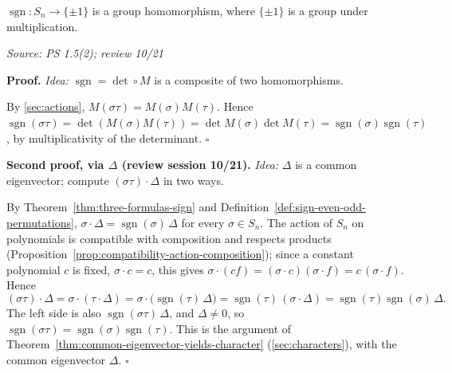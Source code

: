\documentclass[11pt]{report}
\newcommand{\sgn}{\operatorname{sgn}}
\renewenvironment{proof}[1][Proof]{\noindent\textbf{#1.} }{\hfill$\square$\par\vspace{5pt}}
\newcommand{\srcline}[1]{\par\hfill{\footnotesize\textit{Source: #1}}}
\begin{document}
\begin{thmbox}\label{thm:sign-homomorphism}
$\sgn: S_n \to \{\pm 1\}$ is a group homomorphism, where $\{\pm 1\}$ is a group under multiplication.
\srcline{PS 1.5(2); review 10/21}
\end{thmbox}

\begin{proof}
\textit{Idea:} $\sgn = \det \circ M$ is a composite of two homomorphisms.\par
By \ref{sec:actions}, $M(\sigma\tau) = M(\sigma)M(\tau)$. Hence $\sgn(\sigma\tau) = \det(M(\sigma)M(\tau)) = \det M(\sigma)\det M(\tau) = \sgn(\sigma)\sgn(\tau)$, by multiplicativity of the determinant.
\end{proof}

\begin{proof}[Second proof, via $\Delta$ (review session 10/21)]
\textit{Idea:} $\Delta$ is a common eigenvector; compute $(\sigma\tau) \cdot \Delta$ in two ways.\par
By Theorem~\ref{thm:three-formulas-sign} and Definition~\ref{def:sign-even-odd-permutations}, $\sigma \cdot \Delta = \sgn(\sigma)\,\Delta$ for every $\sigma \in S_n$. The action of $S_n$ on polynomials is compatible with composition and respects products (Proposition~\ref{prop:compatibility-action-composition}); since a constant polynomial $c$ is fixed, $\sigma \cdot c = c$, this gives $\sigma \cdot (c f) = (\sigma \cdot c)(\sigma \cdot f) = c\,(\sigma \cdot f)$. Hence
\[ (\sigma\tau) \cdot \Delta = \sigma \cdot (\tau \cdot \Delta) = \sigma \cdot \big(\sgn(\tau)\,\Delta\big) = \sgn(\tau)\,(\sigma \cdot \Delta) = \sgn(\tau)\sgn(\sigma)\,\Delta. \]
The left side is also $\sgn(\sigma\tau)\,\Delta$, and $\Delta \neq 0$, so $\sgn(\sigma\tau) = \sgn(\sigma)\sgn(\tau)$. This is the argument of Theorem~\ref{thm:common-eigenvector-yields-character} (\ref{sec:characters}), with the common eigenvector $\Delta$.
\end{proof}
\end{document}
